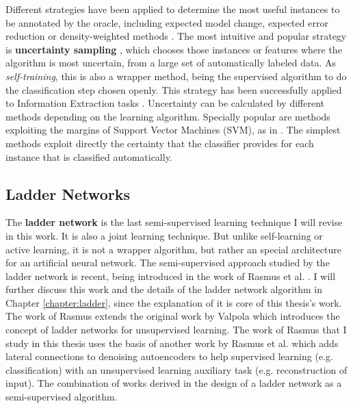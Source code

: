 Different strategies have been applied to determine the most useful instances
to be annotated by the oracle, including expected model change, expected error
reduction or density-weighted methods \cite{settles.tr09}. The most intuitive
and popular strategy is {\bf uncertainty sampling}
\cite{Lewis94heterogeneousuncertainty}, which chooses those instances or
features where the algorithm is most uncertain, from a large set of
automatically labeled data. As {\em self-training}, this is also a wrapper
method, being the supervised algorithm to do the classification step chosen
openly. This strategy has been successfully applied to Information Extraction
tasks \cite{Culotta:2005:RLE:1619410.1619452,settles.emnlp08}. Uncertainty can
be calculated by different methods depending on the learning algorithm.
Specially popular are methods exploiting the margins of Support Vector Machines
(SVM), as in \cite{Tong:2002:SVM:944790.944793}. The simplest methods exploit
directly the certainty that the classifier provides for each instance that is
classified automatically.

\subsection{Ladder Networks}

The {\bf ladder network} is the last semi-supervised learning technique I will
revise in this work. It is also a joint learning technique. But unlike
self-learning or active learning, it is not a wrapper algorithm, but rather an
special architecture for an artificial neural network. The semi-supervised
approach studied by the ladder network is recent, being introduced in the work
of Rasmus et al. \cite{Rasmus:2015aa}. I will further discuss this work and the
details of the ladder network algorithm in Chapter \ref{chapter:ladder}, since
the explanation of it is core of this thesis's work. The work of Rasmus extends
the original work by Valpola \cite{Valpola:2014aa} which introduces the concept
of ladder networks for unsupervised learning. The work of Rasmus that I study
in this thesis uses the basis of another work by Rasmus et al.
\cite{Rasmus:2015ab} which adds lateral connections to denoising autoencoders
to help supervised learning (e.g. classification) with an unsupervised learning
auxiliary task (e.g. reconstruction of input). The combination of works derived
in the design of a ladder network as a semi-supervised algorithm.
